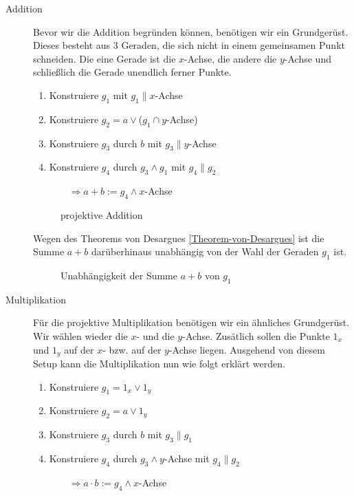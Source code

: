     \begin{description}
        \item[Addition] Bevor wir die Addition begründen können, benötigen wir ein Grundgerüst. Dieses besteht aus $3$ Geraden,
              die sich nicht in einem gemeinsamen Punkt schneiden. Die eine Gerade ist die $x$-Achse, die andere die $y$-Achse und
              schließlich die Gerade unendlich ferner Punkte.
              \begin{enumerate}
                \item Konstruiere $g_1$ mit $g_1 \parallel x$-Achse
                \item Konstruiere $g_2 = a \vee $($g_1\cap y$-Achse)
                \item Konstruiere $g_3$ durch $b$ mit $g_3 \parallel y$-Achse
                \item Konstruiere $g_4$ durch $g_3 \wedge g_1$ mit $g_4 \parallel g_2$ \par
                      $\qquad \Rightarrow a+b := g_4 \wedge x$-Achse
              \end{enumerate}

              \begin{figure}[ht]
                
                \caption{projektive Addition}
              \end{figure}

              Wegen des Theorems von Desargues \ref{Theorem-von-Desargues} ist die Summe $a+b$ darüberhinaus unabhängig von der Wahl
              der Geraden $g_1$ ist.

              \begin{figure}[ht]
                
                \caption{Unabhängigkeit der Summe $a+b$ von $g_1$}
              \end{figure}

        \item[Multiplikation] Für die projektive Multiplikation benötigen wir ein ähnliches Grundgerüst. Wir wählen wieder die $x$- und
              die $y$-Achse. Zusätlich sollen die Punkte $1_x$ und $1_y$ auf der $x$- bzw. auf der $y$-Achse liegen. Ausgehend von diesem
              Setup kann die Multiplikation nun wie folgt erklärt werden.

              \begin{enumerate}
                \item Konstruiere $g_1 = 1_x \vee 1_y$
                \item Konstruiere $g_2 = a \vee 1_y$
                \item Konstruiere $g_3$ durch $b$ mit $g_3 \parallel g_1$
                \item Konstruiere $g_4$ durch $g_3 \wedge y$-Achse mit $g_4 \parallel g_2$ \par
                      $\qquad \Rightarrow a\cdot b := g_4 \wedge x$-Achse
              \end{enumerate}


\end{description}
